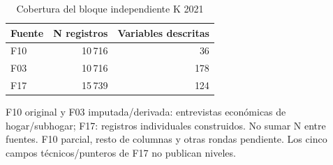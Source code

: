\begin{table}[!htbp]
\centering
\caption{Cobertura del bloque independiente K 2021}\label{tab:eda-k2021-cobertura}
\small\setlength{\tabcolsep}{4pt}
\renewcommand{\arraystretch}{1.15}
\begin{tabular}{lrr}
\toprule
\textbf{Fuente} & \textbf{N registros} & \textbf{Variables descritas} \\
\midrule
F10 & 10\,716 & 36 \\
F03 & 10\,716 & 178 \\
F17 & 15\,739 & 124 \\
\bottomrule
\end{tabular}
\par\medskip
\parbox{\linewidth}{\footnotesize F10 original y F03 imputada/derivada: entrevistas económicas de hogar/subhogar; F17: registros individuales construidos. No sumar N entre fuentes. F10 parcial, resto de columnas y otras rondas pendiente. Los cinco campos técnicos/punteros de F17 no publican niveles.}
\end{table}
